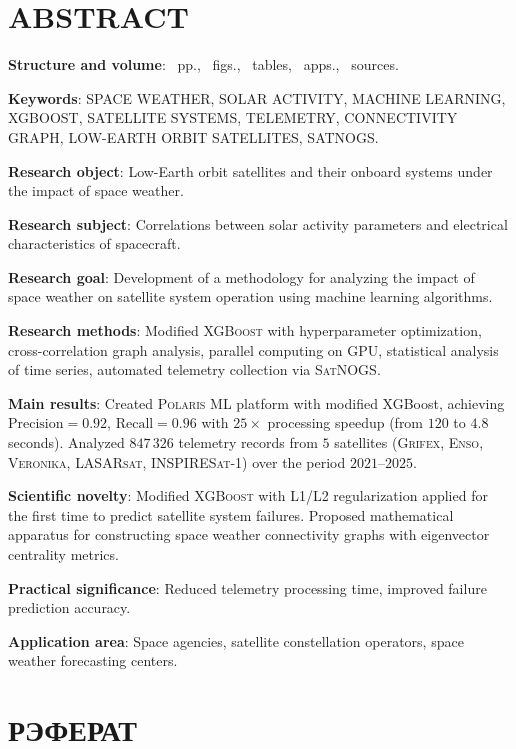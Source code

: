\chapter*{ABSTRACT}

\textbf{Structure and volume}: \maincontentpages~pp., \totalfigures~figs.,
\totaltables~tables, ~apps., \thetotalsources~sources.

\textbf{Keywords}: SPACE WEATHER, SOLAR ACTIVITY, MACHINE LEARNING, XGBOOST,
SATELLITE SYSTEMS, TELEMETRY, CONNECTIVITY GRAPH, LOW-EARTH ORBIT SATELLITES,
SATNOGS.

\textbf{Research object}: Low-Earth orbit satellites and their onboard systems under the impact of space weather.

\textbf{Research subject}: Correlations between solar activity parameters and electrical characteristics of spacecraft.

\textbf{Research goal}: Development of a methodology for analyzing the impact of space weather on satellite system operation using machine learning algorithms.

\textbf{Research methods}: Modified \textsc{XGBoost} with hyperparameter optimization, cross-correlation graph analysis, parallel computing on \textsc{GPU}, statistical analysis of time series, automated telemetry collection via \textsc{SatNOGS}.

\textbf{Main results}: Created \textsc{Polaris ML} platform with modified XGBoost, achieving 
$\text{Precision} = 0.92$, $\text{Recall} = 0.96$ with $25{\times}$ processing speedup (from $120$ to $4.8$ seconds). Analyzed $847{\,}326$ telemetry records from $5$ satellites (\textsc{Grifex}, \textsc{Enso}, \textsc{Veronika}, \textsc{LASARsat}, \textsc{INSPIRESat-1}) over the period $2021$--$2025$.

\textbf{Scientific novelty}: Modified \textsc{XGBoost} with L1/L2 regularization applied for the first time to predict satellite system failures. Proposed mathematical apparatus for constructing space weather connectivity graphs with eigenvector centrality metrics.

\textbf{Practical significance}: Reduced telemetry processing time, improved failure prediction accuracy.

\textbf{Application area}: Space agencies, satellite constellation operators, space weather forecasting centers.





\chapter*{РЭФЕРАТ}

